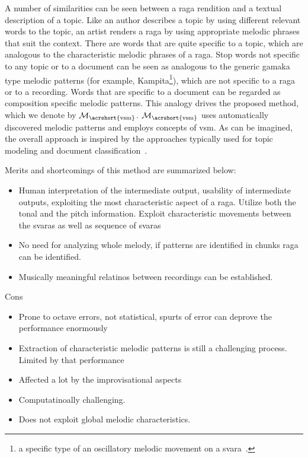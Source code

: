 
A number of similarities can be seen between a \gls{raga} rendition and a textual description of a topic. Like an author describes a topic by using different relevant words to the topic, an artist renders a \gls{raga} by using appropriate melodic phrases that suit the context. There are words that are quite specific to a topic, which are analogous to the characteristic melodic phrases of a \gls{raga}. Stop words not specific to any topic or to a document can be seen as analogous to the generic gamaka type melodic patterns (for example, Kampita\footnote{a specific type of an oscillatory melodic movement on a svara~\cite{krishna2012carnatic}.}), which are not specific to a \gls{raga} or to a recording. Words that are specific to a document can be regarded as composition specific melodic patterns. This analogy drives the proposed method, which we denote by $\mathcal{M}_\mathrm{\acrshort{vsm}}$. $\mathcal{M}_\mathrm{\acrshort{vsm}}$ uses automatically discovered melodic patterns and employs concepts of \gls{vsm}. As can be imagined, the overall approach is inspired by the approaches typically used for topic modeling and document classification~.

Merits and shortcomings of this method are summarized below:
\begin{itemize}
	\item Human interpretation of the intermediate output, usability of intermediate outputs, exploiting the most characteristic aspect of a raga. Utilize both the tonal and the pitch information. Exploit characteristic movements between the svaras as well as sequence of svaras
	\item No need for analyzing whole melody, if patterns are identified in chunks raga can be identified.
	\item Musically meaningful relatinos between recordings can be established.
\end{itemize}

Cons
\begin{itemize}
	\item Prone to octave errors, not statistical, spurts of error can deprove the performance enormously
	\item Extraction of characteristic melodic patterns is still a challenging process. Limited by that performance
	\item Affected a lot by the improvisational aspects
	\item Computatinoally challenging. 
	\item Does not exploit global melodic characteristics.
\end{itemize}

